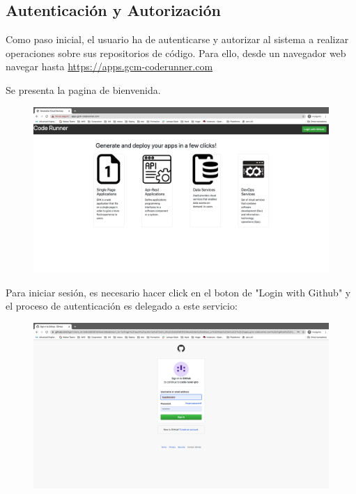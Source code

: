 \documentclass[a4paper,11pt]{book}
\begin{document}
\subsection{Autenticación y Autorización}

Como paso inicial, el usuario ha de autenticarse y autorizar al sistema a realizar operaciones sobre sus repositorios de código. Para ello, desde un navegador web navegar hasta \url{https://apps.gcm-coderunner.com}

Se presenta la pagina de bienvenida. 

\begin{figure}[H]
\centering
\includegraphics[scale=0.2]{imagenes/casouso/1.png}
\caption{   }
\end{figure}

Para iniciar sesión, es necesario hacer click en el boton de "Login with Github" y el proceso de autenticación es delegado a este servicio:

\begin{figure}[H]
\centering
\includegraphics[scale=0.2]{imagenes/casouso/2.png}
\caption{   }
\end{figure}
\end{document}
